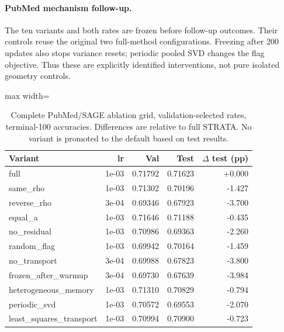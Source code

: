 \paragraph{PubMed mechanism follow-up.} The ten variants and both rates are frozen before follow-up outcomes. Their controls reuse the original two full-method configurations. Freezing after 200 updates also stops variance resets; periodic pooled SVD changes the flag objective. Thus these are explicitly identified interventions, not pure isolated geometry controls.
\begin{table}[htbp]\centering\footnotesize\setlength{\tabcolsep}{3pt}\caption{Complete PubMed/SAGE ablation grid, validation-selected rates, terminal-100 accuracies. Differences are relative to full STRATA. No variant is promoted to the default based on test results.}\label{tab:pubmed-ablations}\begin{adjustbox}{max width=\linewidth}
\begin{tabular}{lrrrr}\toprule Variant & lr & Val & Test & $\Delta$ test (pp)\\\midrule
\rowcolor{oursbg}
full & 1e-03 & 0.71792 & 0.71623 & +0.000 \\
same\_rho & 1e-03 & 0.71302 & 0.70196 & -1.427 \\
reverse\_rho & 3e-04 & 0.69346 & 0.67923 & -3.700 \\
equal\_a & 1e-03 & 0.71646 & 0.71188 & -0.435 \\
no\_residual & 1e-03 & 0.70986 & 0.69363 & -2.260 \\
random\_flag & 1e-03 & 0.69942 & 0.70164 & -1.459 \\
no\_transport & 3e-04 & 0.69988 & 0.67823 & -3.800 \\
frozen\_after\_warmup & 3e-04 & 0.69730 & 0.67639 & -3.984 \\
heterogeneous\_memory & 1e-03 & 0.71310 & 0.70829 & -0.794 \\
periodic\_svd & 1e-03 & 0.70572 & 0.69553 & -2.070 \\
least\_squares\_transport & 1e-03 & 0.70994 & 0.70900 & -0.723 \\
\bottomrule\end{tabular}
\end{adjustbox}\end{table}
